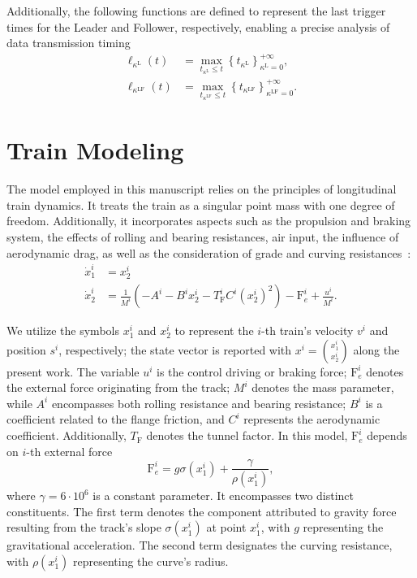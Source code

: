 Additionally, the following functions are defined to represent the last trigger times for the Leader and Follower, respectively, enabling a precise analysis of data transmission timing
\begin{align*}
	\ell_{\kappa^\mathrm{L}}(t) &= \max_{t_{\kappa^\mathrm{L}} \leq t} \left \{ t_{\kappa^\mathrm{L}} \right \}_{\kappa^\mathrm{L}=0}^{+\infty}, \\
	\ell_{\kappa^\mathrm{LF}}(t) &= \max_{t_{\kappa^\mathrm{LF}} \leq t} \left \{ t_{\kappa^\mathrm{LF}} \right \}_{\kappa^\mathrm{LF}=0}^{+\infty}.
\end{align*}
%


\section{Train Modeling}
\label{sec:TrainModeling}

The model employed in this manuscript relies on the principles of longitudinal train dynamics. It treats the train as a singular point mass with one degree of freedom. Additionally, it incorporates aspects such as the propulsion and braking system, the effects of rolling and bearing resistances, air input, the influence of aerodynamic drag, as well as the consideration of grade and curving resistances~\cite{ltdModel}:
%
\begin{align}  \label{eq:stateDynamic}
	\dot{x}_1^i &= x_2^i  \nonumber \\
	\dot{x}_2^i &= \frac{1}{M^i}(-A^i-B^i x_2^i - T_\mathrm{F}^i C^i (x_2^i)^2)-\mathrm{F}_e^i + \frac{u^i}{M^i}.
\end{align}
%

We utilize the symbols ${x}_1^i$ and ${x}_2^i$ to represent the $i$-th train's velocity $v^i$ and position $s^i$, respectively; the state vector is reported with $x^i=\binom{x^i_1}{x^i_2}$  along the present work. The variable $u^i$ is the control driving or braking force; $\mathrm{F}_e^i$ denotes the external force originating from the track; $M^i$ denotes the mass parameter, while $A^i$ encompasses both rolling resistance and bearing resistance; $B^i$ is a coefficient related to the flange friction, and $C^i$ represents the aerodynamic coefficient. Additionally, $T_\mathrm{F}$ denotes the tunnel factor.
%
In this model, $\mathrm{F}^i_e$ depends on $i$-th external force
%
\begin{equation*}
	\mathrm{F}_e^i = g \sigma(x_1^i) + \frac{\gamma}{\rho(x_1^i)}, 
\end{equation*}
%
where $\gamma=6\cdot10^6$ is a constant parameter. It encompasses two distinct constituents. The first term denotes the component attributed to gravity force resulting from the track's slope $\sigma(x_1^i)$  at point $x_1^i$, with $g$ representing the gravitational acceleration. The second term designates the curving resistance, with ${\rho(x_1^i)}$ representing the curve's radius.

